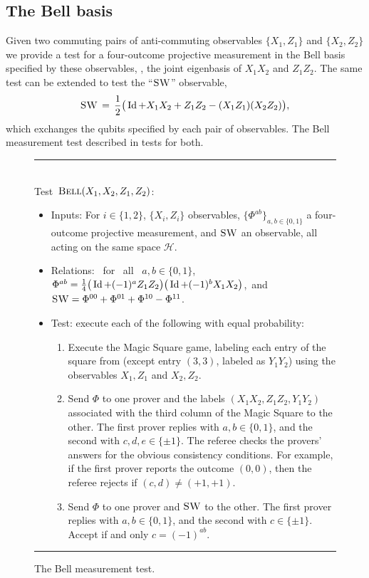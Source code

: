 \documentclass{toc}
\newcommand{\Id}{\ensuremath{\mathop{\rm Id}\nolimits}}
\newcommand{\mH}{\mathcal{H}}
\newcommand{\bellt}{\textsc{Bell}}
\newcommand{\SWAP}{\textsc{SW}}
\begin{document}
\subsection{The Bell basis}
\label{sec:bell}


Given two commuting pairs of anti-commuting observables $\{X_1,Z_1\}$ and $\{X_2,Z_2\}$ we provide a test for a four-outcome projective measurement in the Bell basis specified by these observables, \ie, the joint eigenbasis of $X_1X_2$ and $Z_1Z_2$. The same test can be extended to test the ``$\SWAP$'' observable,
\begin{equation}\label{eq:def-swap}
 \SWAP \,=\, \frac{1}{2} \big( \Id + X_1X_2 + Z_1Z_2 - (X_1Z_1)(X_2Z_2) \big),
\end{equation}
 which exchanges the  qubits specified by each pair of observables. The Bell measurement test described in  tests for both. 


\begin{figure}[H]
\rule[1ex]{\textwidth}{0.5pt}\\
\justifying
Test~$\bellt(X_1,X_2,Z_1,Z_2)$:
\begin{itemize}
\item Inputs: For $i\in\{1,2\}$, $\{X_i,Z_i\}$ observables, $\{\Phi^{ab}\}_{a,b\in\{0,1\}}$ a four-outcome projective measurement, and $\SWAP$ an observable, all acting on the same space $\mH$.
%
    \item Relations: \ for \ all \ $a,b\in\{0,1\}$, $\Phi^{ab} = \frac{1}{4}\big(\Id+(-1)^a Z_1Z_2\big)\big(\Id+(-1)^bX_1X_2\big)$,\ and 
      $\SWAP = \Phi^{00} + \Phi^{01} + \Phi^{10} - \Phi^{11}$.   
    \item Test: execute each of the following with equal probability:
		\begin{enumerate}
		\item[(a)] Execute the Magic Square game, labeling each entry of the square from  (except entry $(3,3)$, labeled as $Y_1Y_2$) using the observables $X_1,Z_1$ and $X_2,Z_2$.
		\item[(b)] Send $\Phi$ to one prover and the labels $(X_1X_2,Z_1Z_2,Y_1Y_2)$ associated with the third column of the Magic Square to the other.  The first prover replies with $a,b\in\{0,1\}$, and the second with $c,d,e\in \{\pm 1\}$. The referee checks the provers' answers for the obvious consistency conditions. For example, if the first prover reports the outcome $(0,0)$, then the referee rejects if $(c,d)\neq (+1,+1)$. 
		\item[(c)] Send $\Phi$ to one prover and $\SWAP$ to the other. The first prover replies with $a,b\in\{0,1\}$, and the second with $c\in \{\pm 1\}$. Accept if and only $c=(-1)^{ab}$. 
		\end{enumerate}
\end{itemize}
\rule[2ex]{\textwidth}{0.5pt}\vspace{-.5cm}
\caption{The Bell measurement test.}
\label{fig:bell}
\end{figure}
\end{document}
